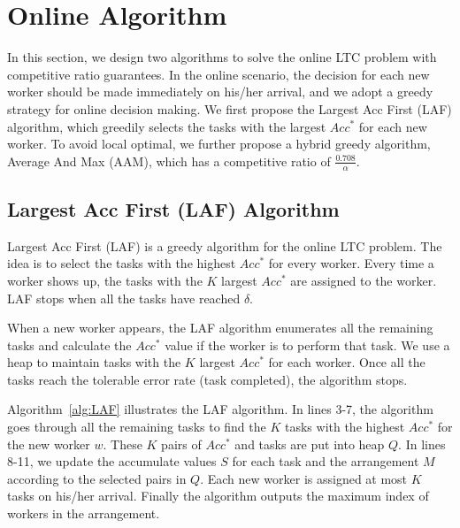 \section{Online Algorithm}
\label{sec:online}
In this section, we design two algorithms to solve the online LTC problem with competitive ratio guarantees.
In the online scenario, the decision for each new worker should be made immediately on his/her arrival, and we adopt a greedy strategy for online decision making.
We first propose the Largest Acc First (LAF) algorithm, which greedily selects the tasks with the largest $Acc^*$ for each new worker.
To avoid local optimal, we further propose a hybrid greedy algorithm, Average And Max (AAM), which has a competitive ratio of $\frac{0.708}{\alpha}$.

\subsection{Largest Acc First (LAF) Algorithm}
Largest Acc First (LAF) is a greedy algorithm for the online LTC problem.
The idea is to select the tasks with the highest $Acc^*$ for every worker.
Every time a worker shows up, the tasks with the $K$ largest $Acc^{*}$ are assigned to the worker.
LAF stops when all the tasks have reached $\delta$.

When a new worker appears, the LAF algorithm enumerates all the remaining tasks and calculate the $Acc^{*}$ value if the worker is to perform that task.
We use a heap to maintain tasks with the $K$ largest $Acc^*$ for each worker.
Once all the tasks reach the tolerable error rate (\ie task completed), the algorithm stops.

Algorithm~\ref{alg:LAF} illustrates the LAF algorithm.
In lines 3-7, the algorithm goes through all the remaining tasks to find the $K$ tasks with the highest $Acc^{*}$ for the new worker $w$.
These $K$ pairs of $Acc^{*}$ and tasks are put into heap $Q$.
In lines 8-11, we update the accumulate values $S$ for each task and the arrangement $M$ according to the selected pairs in $Q$.
Each new worker is assigned at most $K$ tasks on his/her arrival.
Finally the algorithm outputs the maximum index of workers in the arrangement.




